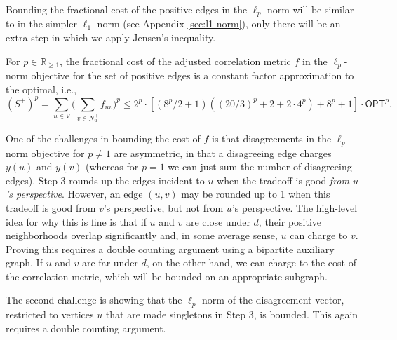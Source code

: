Bounding the fractional cost of the positive edges in the $\ell_p$-norm will be similar to in the simpler $\ell_1$-norm (see Appendix \ref{sec:l1-norm}), only there will be an extra step in which we apply Jensen's inequality. 
\begin{lemma} \label{lem: lp_bdd-pos}
    For $p \in \mathbb{R}_{\geq 1}$, the fractional cost of the adjusted correlation metric $f$ in the $\ell_p$-norm objective for the set of positive edges is a constant factor approximation to the optimal, i.e.,
    $$(S^+)^p =  \sum_{u \in V} \Big(\sum_{v \in N_u^+} f_{uv} \Big)^p \leq 
2^p \cdot [(8^p/2 +1)((20/3)^p + 2 + 2 \cdot 4^p) + 8^p +1 ] \cdot \textsf{OPT}^p.
$$
\end{lemma}

One of the challenges in bounding the cost of $f$ is that disagreements in the $\ell_p$-norm objective for $p \neq 1$ are asymmetric, in that a disagreeing edge charges $y(u)$ and $y(v)$ (whereas for $p=1$ we can just sum the number of disagreeing edges). Step 3 rounds up the edges incident to $u$ when the tradeoff is good \textit{from $u$'s perspective}. However, an edge $(u,v)$ may be rounded up to 1 when this tradeoff is good from $v$'s perspective, but not from $u$'s perspective. The high-level idea for why this is fine is that if $u$ and $v$ are close under $d$, their positive neighborhoods overlap significantly and, in some average sense, $u$ can charge to $v$. Proving this requires a double counting argument using a bipartite auxiliary graph. If $u$ and $v$ are far under $d$, on the other hand, we can charge to the cost of the correlation metric, which will be bounded on an appropriate subgraph.

The second challenge is showing that the $\ell_p$-norm of the disagreement vector, restricted to vertices $u$ that are made singletons in Step 3, is bounded. This again requires a double counting argument.


